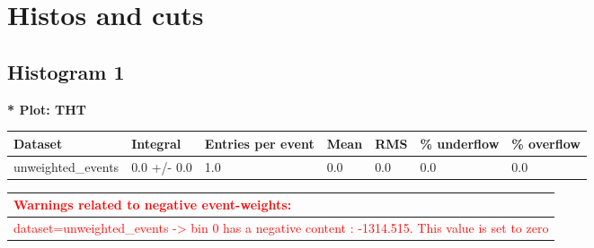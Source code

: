 \documentclass[a4paper, 10pt]{article}
\begin{document}
\newpage
\section{ Histos and cuts}

\subsection{ Histogram 1}

\textbf{* Plot: THT}\\
   \begin{table}[H]
  \begin{center}
    \begin{tabular}{|m{23.0mm}|m{23.0mm}|m{18.0mm}|m{19.0mm}|m{19.0mm}|m{19.0mm}|m{19.0mm}|}
      \hline
      {\cellcolor{yellow}         Dataset}& {\cellcolor{yellow}         Integral}& {\cellcolor{yellow}         Entries per event}& {\cellcolor{yellow}         Mean}& {\cellcolor{yellow}         RMS}& {\cellcolor{yellow}         \% underflow}& {\cellcolor{yellow}         \% overflow}\\
      \hline
      {\cellcolor{white}         unweighted\_events}& {\cellcolor{white}         0.0 +/\-- 0.0}& {\cellcolor{white}         1.0}& {\cellcolor{white}         0.0}& {\cellcolor{white}         0.0}& {\cellcolor{green}         0.0}& {\cellcolor{green}         0.0}\\
\hline
    \end{tabular}
  \end{center}
\end{table}

\begin{table}[H]
  \begin{center}
    \begin{tabular}{|m{140.0mm}|}
      \hline
      {\cellcolor{white}\textcolor{red}{Warnings related to negative event-weights:}}\\
      \hline
      {\cellcolor{white}\textcolor{red}{dataset=unweighted\_events -> bin 0 has a negative content : -1314.515. This value is set to zero}}\\
      \hline
\hline
    \end{tabular}
  \end{center}
\end{table}
\end{document}
